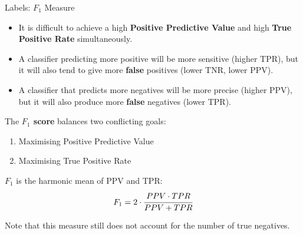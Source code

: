 \documentclass[11pt,compress,t,notes=noshow, xcolor=table]{beamer}
\begin{document}

\begin{vbframe}{Labels: $F_1$ Measure}

\small

\begin{itemize}
  \item It is difficult to achieve a high \textbf{Positive Predictive Value} and 
  high \textbf{True Positive Rate} simultaneously.
   \item A classifier predicting more positive will be more 
   sensitive (higher TPR), but it will also tend to give more \textbf{false} 
   positives (lower TNR, lower PPV).
   \item A classifier that predicts more negatives will be more precise 
   (higher PPV), but it will also produce more \textbf{false} negatives 
   (lower TPR).
 \end{itemize}

The \textbf{$F_1$ score} balances two conflicting goals:\\%
\begin{enumerate}
 \item Maximising Positive Predictive Value
 \item Maximising True Positive Rate\\[.5em]
\end{enumerate}

$F_1$ is the harmonic mean of PPV and TPR:
$$F_1 = 2 \cdot \cfrac{PPV \cdot TPR}{PPV + TPR}$$

Note that this measure still does not account for the number of true
negatives.

\framebreak

\normalsize


\end{vbframe}
\end{document}
